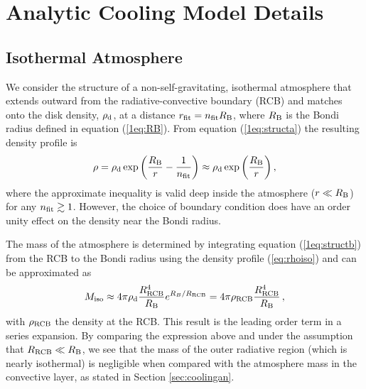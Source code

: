\chapter{Analytic Cooling Model Details}
\label{sec:analytic}

\section{Isothermal Atmosphere}
\label{iso}

We consider the structure of a non-self-gravitating, isothermal atmosphere that extends outward from the radiative-convective boundary (RCB) and matches onto the disk density, $\rho_{\rm d}$, at a distance $r_{\rm fit} = n_{\rm fit} R_{\rm B}$, where $R_{\rm B}$ is the Bondi radius defined in equation (\ref{1eq:RB}). From equation (\ref{1eq:structa}) the resulting density profile is
\begin{equation} \label{eq:rhoiso}
\rho = \rho_{\rm d} \exp \left({R_{\rm B} \over r} - {1 \over n_{\rm{fit}}} \right) \approx   \rho_{\rm{d}} \exp \left(R_{\rm B} \over r  \right),
\end{equation} 
where the approximate inequality is valid deep inside the atmosphere ($r \ll R_{\rm B}$) for any $n_{\rm fit} \gtrsim 1$.  However, the choice of boundary condition does have an order unity effect on the density near the Bondi radius. 

The mass of the atmosphere is determined by integrating equation (\ref{1eq:structb}) from the RCB to the Bondi radius using the density profile (\ref{eq:rhoiso}) and can be approximated as
\begin{equation} \label{eq:MatmISO}
M_{\rm iso} \approx 4 \pi \rho_{\rm d} {R_{\rm RCB}^4 \over R_{\rm B}} e^{R_B/R_{\rm RCB}} = 4\pi \rho_{\rm RCB} \frac{R_{\rm RCB}^4}{R_{\rm B}} \, ,
\end{equation}
with $\rho_{\rm RCB}$ the density at the RCB.
This result is the leading order term in a series expansion. By comparing the expression above and  under the assumption that $R_{\rm RCB} \ll R_{\rm B}$, we see that the mass of the outer radiative region (which is nearly isothermal) is negligible when compared with the atmosphere mass in the convective layer, as stated in Section \ref{sec:coolingan}.

